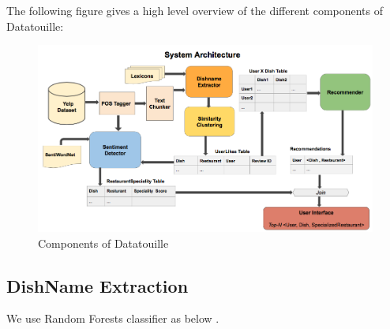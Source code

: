 \documentclass[twoside,12pt]{article}
\begin{document}
The following figure gives a high level overview of the different components of Datatouille:
\begin{figure}[ht]
  \includegraphics[width=\textwidth]{systemArch.png}	
  \caption{Components of Datatouille}
\end{figure}

\subsection{DishName Extraction}
We use Random Forests classifier as below \cite{ritter_clark}. 
\end{document}
